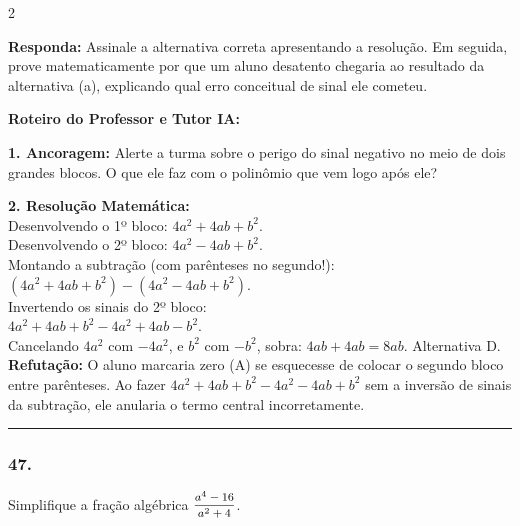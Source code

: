 \begin{multicols*}{2}
\begin{enunciadoLiteral}
\begin{boxresponda}
\textbf{Responda:} Assinale a alternativa correta apresentando a resolução. Em seguida, prove matematicamente por que um aluno desatento chegaria ao resultado da alternativa (a), explicando qual erro conceitual de sinal ele cometeu.
\end{boxresponda}
\end{enunciadoLiteral}

\ifgabarito
    \begin{tcolorbox}[colback=CorTitUm!5, colframe=CorTitUm, boxrule=1pt, arc=4pt, left=6pt, right=6pt, top=6pt, bottom=6pt]
    \small\textbf{\textcolor{CorTitUm}{Roteiro do Professor e Tutor IA:}}\par\vspace{0.1cm}
    \color{CinzaEscuro}
    \textbf{1. Ancoragem:} Alerte a turma sobre o perigo do sinal negativo no meio de dois grandes blocos. O que ele faz com o polinômio que vem logo após ele?\par\vspace{0.1cm}
    \textbf{2. Resolução Matemática:}\\
    Desenvolvendo o 1º bloco: $4a^2 + 4ab + b^2$.\\
    Desenvolvendo o 2º bloco: $4a^2 - 4ab + b^2$.\\
    Montando a subtração (com parênteses no segundo!):\\
    $(4a^2 + 4ab + b^2) - (4a^2 - 4ab + b^2)$.\\
    Invertendo os sinais do 2º bloco:\\
    $4a^2 + 4ab + b^2 - 4a^2 + 4ab - b^2$.\\
    Cancelando $4a^2$ com $-4a^2$, e $b^2$ com $-b^2$, sobra: $4ab + 4ab = 8ab$. Alternativa D.\\
    \textbf{Refutação:} O aluno marcaria zero (A) se esquecesse de colocar o segundo bloco entre parênteses. Ao fazer $4a^2 + 4ab + b^2 - 4a^2 - 4ab + b^2$ sem a inversão de sinais da subtração, ele anularia o termo central incorretamente.
    \end{tcolorbox}
\fi

\par\vspace{\espacoQuestao}

\noindent\textcolor{CorLinha}{\rule{\linewidth}{0.5pt}} 
\par\vspace{\espacoPreQuestao}
\subsubsection*{47.} 
\begin{enunciadoLiteral}
Simplifique a fração algébrica $ \mfrac{a^4 - 16}{a^2 + 4} $.
\end{enunciadoLiteral}


\end{multicols*}
